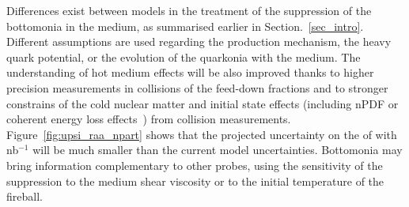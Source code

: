 \documentclass[../report.tex]{subfiles}
\providecommand{\main}{..}
\begin{document}
% 



Differences exist between models in the treatment of the suppression of the bottomonia in the medium, as summarised earlier in Section.~\ref{sec_intro}.
Different assumptions are used regarding the production mechanism, the heavy quark potential, or the evolution of the quarkonia with the medium. 
The understanding of hot medium effects will be also improved thanks to higher precision measurements in \pp collisions of the feed-down fractions
   and to stronger constrains of the cold nuclear matter and initial state effects (including nPDF or coherent energy loss effects~\cite{Arleo:2014oha}) from \pPb collision measurements.
Figure~\ref{fig:upsi_raa_npart} shows that the projected uncertainty on the \raa of \PGU with \unit[10]{nb}$^{-1}$ will be much smaller than the current model uncertainties.
Bottomonia may bring information
complementary to other probes, using the sensitivity of the suppression to the medium shear viscosity or to the initial temperature of the fireball.

% 
\end{document}
